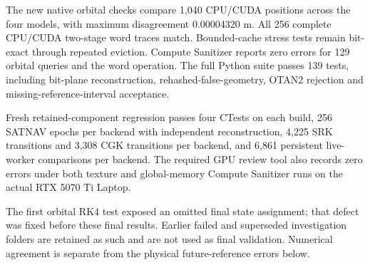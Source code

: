 The new native orbital checks compare 1,040 CPU/CUDA positions across the four models, with maximum disagreement 0.00004320 m. All 256 complete CPU/CUDA two-stage word traces match. Bounded-cache stress tests remain bit-exact through repeated eviction. Compute Sanitizer reports zero errors for 129 orbital queries and the word operation. The full Python suite passes 139 tests, including bit-plane reconstruction, rehashed-false-geometry, OTAN2 rejection and missing-reference-interval acceptance.


Fresh retained-component regression passes four CTests on each build, 256 SATNAV
epochs per backend with independent reconstruction, 4,225 SRK transitions and
3,308 CGK transitions per backend, and 6,861 persistent live-worker comparisons
per backend. The required GPU review tool also records zero errors under both
texture and global-memory Compute Sanitizer runs on the actual RTX 5070 Ti Laptop.

The first orbital RK4 test exposed an omitted final state assignment; that defect
was fixed before these final results. Earlier failed and superseded investigation
folders are retained as such and are not used as final validation. Numerical
agreement is separate from the physical future-reference errors below.
